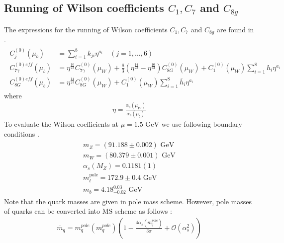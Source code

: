 \appendix
\chapter{}
\section{Running of Wilson coefficients $C_1, C_7$ and $C_{8g}$}\label{app:Wilson}

The expressions for the running of Wilson coefficients $C_1, C_7$ and $C_{8g}$ are found in \cite{Buras:1998raa, Manohar:2000dt}.
\begin{eqnarray}
\begin{aligned} C_{j}^{(0)}\left(\mu_{b}\right) &=\sum_{i=1}^{8} k_{j i} \eta^{a_{i}} \quad(j=1, \ldots, 6) \\ C_{7 \gamma}^{(0) e f f}\left(\mu_{b}\right) &=\eta^{\frac{16}{23}} C_{7 \gamma}^{(0)}\left(\mu_{W}\right)+\frac{8}{3}\left(\eta^{\frac{14}{23}}-\eta^{\frac{16}{23}}\right) C_{8 G}^{(0)}\left(\mu_{W}\right)+C_{1}^{(0)}\left(\mu_{W}\right) \sum_{i=1}^{8} h_{i} \eta^{a_{i}} \\ C_{8 G}^{(0) e f f}\left(\mu_{b}\right) &=\eta^{\frac{14}{23}} C_{8 G}^{(0)}\left(\mu_{W}\right)+C_{1}^{(0)}\left(\mu_{W}\right) \sum_{i=1}^{8} \overline{h}_{i} \eta^{a_{i}} \end{aligned}
\end{eqnarray}
where
\begin{eqnarray}
\eta=\frac{\alpha_{s}\left(\mu_{W}\right)}{\alpha_{s}\left(\mu_{b}\right)}
\end{eqnarray}
To evaluate the Wilson coefficients at $\mu=1.5\text{ GeV}$ we use following boundary conditions \cite{Mohr:2015ccw, Tanabashi:2018oca}.
\begin{eqnarray}
\begin{aligned}
m_Z=(91.188\pm 0.002)\mbox{ GeV}\\
m_W=(80.379\pm 0.001)\mbox{ GeV}\\
\alpha_s(M_Z)=0.1181(1)\\
m_t^{\text{pole}}=172.9\pm0.4\mbox{ GeV}\\
m_b=4.18^{0.03}_{-0.02}\mbox{ GeV}
\end{aligned}
\end{eqnarray}
Note that the quark masses are given in pole mass scheme. However, pole masses of quarks can be converted into $\overline{\text{MS}}$ scheme as follows \cite{Tanabashi:2018oca}:
\begin{eqnarray}\label{polemss}
\overline{m}_{q}=m^{pole}_{q}\left(m^{pole}_{q}\right)\left(1-\frac{4 \alpha_{s}\left(m^{pole}_{q}\right)}{3 \pi}+\mathcal{O}\left(\alpha_{s}^{2}\right)\right)
\end{eqnarray}
